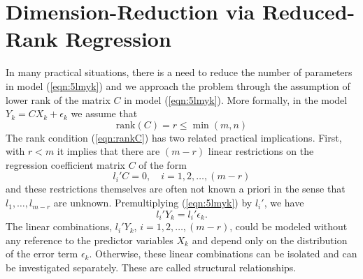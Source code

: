 \section{Dimension-Reduction via Reduced-Rank Regression}


In many practical situations, there is a need to reduce the number of parameters in model (\ref{eqn:5lmyk}) and we approach the problem through the assumption of lower rank of the matrix $C$ in model (\ref{eqn:5lmyk}). More formally, in the model $Y_k=CX_k+\epsilon_k$ we assume that
	\begin{equation}\label{eqn:rankC}
	\text{rank}(C)= r \leq \min(m,n)
	\end{equation}
The rank condition (\ref{eqn:rankC}) has two related practical implications. First, with $r<m$ it implies that there are $(m-r)$ linear restrictions on the regression coefficient matrix $C$ of the form
	\begin{equation}\label{eqn:lprimeC}
	l_i'C=0, \quad i=1,2,\ldots,(m-r)
	\end{equation}
and these restrictions themselves are often not known a priori in the sense that $l_1,\ldots,l_{m-r}$ are unknown. Premultiplying (\ref{eqn:5lmyk})	by $l_i'$, we have
	\begin{equation}\label{eqn:lprimeY}
	l_i'Y_k=l_i'\epsilon_k.
	\end{equation}
The linear combinations, $l_i'Y_k$, $i=1,2,\ldots,(m-r)$, could be modeled without any reference to the predictor variables $X_k$ and depend only on the distribution of the error term $\epsilon_k$. Otherwise, these linear combinations can be isolated and can be investigated separately. These are called structural relationships. 


